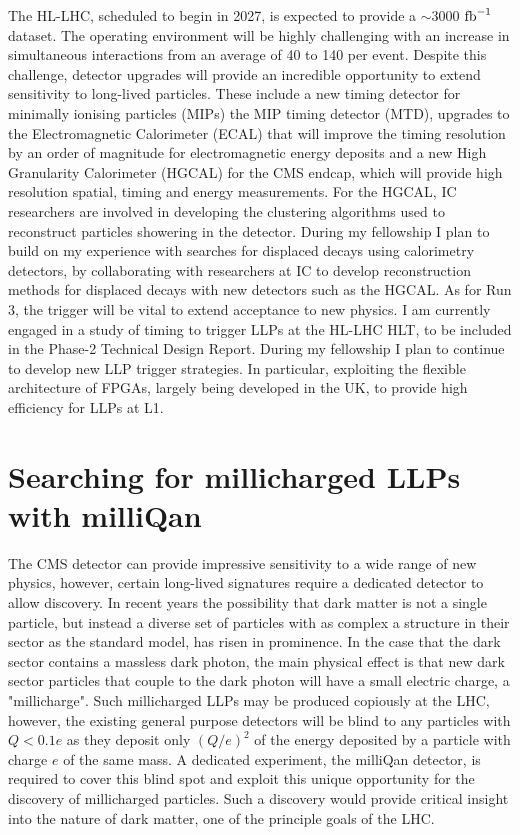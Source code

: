 \documentclass[11pt,a4paper]{article}
\theoremstyle{plain} \numberwithin{equation}{section}
\theoremstyle{definition}
\DeclareRobustCommand{\ifb}{$\rm{fb}^{-1}~$}
\begin{document}
The HL-LHC, scheduled to begin in 2027, is expected to provide a $\sim 3000$ \ifb
dataset. The operating environment will be highly challenging with an increase in simultaneous
interactions from an average of 40 to 140 per event. Despite this challenge, 
detector upgrades will provide an incredible opportunity to extend sensitivity
to long-lived particles. These include a new timing detector for minimally ionising particles (MIPs)
the MIP timing detector (MTD), upgrades to the 
Electromagnetic Calorimeter (ECAL) that will improve the timing resolution by an order of magnitude
for electromagnetic energy deposits and a new High Granularity Calorimeter
(HGCAL) for the CMS endcap, which will provide high resolution spatial,
timing and energy measurements. For the HGCAL, IC researchers are involved in 
developing the clustering algorithms used to reconstruct particles showering in the detector. 
During my fellowship I plan to build on my experience with searches for 
displaced decays using calorimetry detectors, by collaborating with researchers at IC
to develop reconstruction methods for displaced decays with new detectors such as the HGCAL.
As for Run 3, the trigger will be vital to extend acceptance to new physics. I am currently 
engaged in a study of timing to trigger LLPs at the HL-LHC HLT, to be included
in the Phase-2 Technical Design Report. During my fellowship I plan to continue to develop new LLP trigger strategies.
In particular, exploiting the flexible architecture of FPGAs,
largely being developed in the UK, to provide high efficiency for LLPs at L1.

\section*{Searching for millicharged LLPs with milliQan}

The CMS detector can provide impressive sensitivity to a wide
range of new physics, however, certain long-lived signatures
require a dedicated detector to allow discovery. In recent years
the possibility that dark matter is not a single particle, but instead
a diverse set of particles with as complex a 
structure in their sector as the standard model, has risen in prominence.
In the case that the dark sector contains a massless dark photon, the main
physical effect is that new dark sector particles
that couple to the dark photon will have a small electric charge, a
"millicharge". Such millicharged LLPs may be produced copiously at the LHC, however,
the existing general purpose detectors will be blind to any particles with
$Q< 0.1 e$ as they deposit only $(Q/e)^2$ of the energy 
deposited by a particle with charge $e$ of
the same mass. A dedicated experiment, the milliQan detector, is required 
to cover this blind spot and exploit this unique opportunity 
for the discovery of millicharged particles.
Such a discovery would provide critical insight into the nature
of dark matter, one of the principle goals of the LHC.
\end{document}
